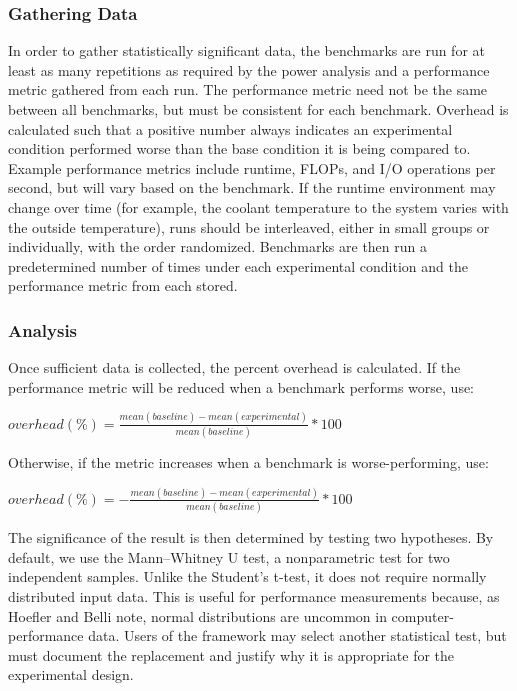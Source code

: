 \documentclass[conference]{IEEEtran}
\begin{document}
\subsubsection{Gathering Data}

In order to gather statistically significant data, the benchmarks are run 
for at least as many repetitions as required by the power analysis and a
performance metric gathered from each run. The performance 
metric need not be the same between all benchmarks, but must be consistent 
for each benchmark. 
Overhead is calculated such that a positive number always indicates an
experimental condition performed worse than the base condition it is being
compared to.
Example performance metrics 
include runtime, FLOPs, and I/O operations per second, but will vary based on 
the benchmark.
If the runtime environment may change over time (for example, the coolant temperature
to the system varies with the outside temperature), runs should be interleaved, 
either in small groups or individually, with
the order randomized.
Benchmarks are then run a predetermined number of times under each 
experimental condition and the performance metric from each stored.

\subsubsection{Analysis}

Once sufficient data is collected, the percent overhead is calculated.
If the performance metric will be reduced when a benchmark performs worse, use:

\(overhead (\%) = \frac{mean(baseline)-mean(experimental)}{mean(baseline)}*100\)

Otherwise, if the metric increases when a benchmark is worse-performing, use:

\(overhead (\%) = -\frac{mean(baseline)-mean(experimental)}{mean(baseline)}*100\)

The significance of the result is then determined by testing two hypotheses.
By default, we use the Mann--Whitney U test, a nonparametric test for two independent
samples. Unlike the Student's t-test, it does not require normally distributed input data.
This is useful for performance measurements because, as Hoefler and Belli
\cite{hoeflerScientificBenchmarkingParallel2015} note, normal distributions are uncommon
in computer-performance data. Users of the framework may select another statistical test,
but must document the replacement and justify why it is appropriate for the experimental design.
\end{document}
